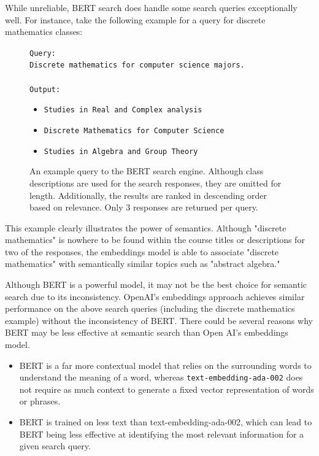\documentclass[
	a4paper, %
	10pt, %
	unnumberedsections, %
	twoside, %
]{LTJournalArticle}
\begin{document}
While unreliable, BERT search does handle some search queries exceptionally well. For instance, take the following example for a query for discrete mathematics classes:

\begin{figure}[h]
	\begin{center}
		\texttt{Query:} \\
		\texttt{Discrete mathematics for computer science majors.} \\
		\texttt{}\\
		\texttt{Output:} 
		\begin{itemize}
			\item \texttt{Studies in Real and Complex analysis}
			\item \texttt{Discrete Mathematics for Computer Science}
			\item \texttt{Studies in Algebra and Group Theory}
		\end{itemize}		
	\end{center}
	\caption{An example query to the BERT search engine. Although class descriptions are used for the search responses, they are omitted for length. Additionally, the results are ranked in descending order based on relevance. Only 3 responses are returned per query.}
\end{figure}

This example clearly illustrates the power of semantics. Although "discrete mathematics" is nowhere to be found within the course titles or descriptions for two of the responses, the embeddings model is able to associate "discrete mathematics" with semantically similar topics such as "abstract algebra." 

Although BERT is a powerful model, it may not be the best choice for semantic search due to its inconsistency. OpenAI's embeddings approach achieves similar performance on the above search queries (including the discrete mathematics example) without the inconsistency of BERT. There could be several reasons why BERT may be less effective at semantic search than Open AI's embeddings model. 

\begin{itemize}
	\item  BERT is a far more contextual model that relies on the surrounding words to understand the meaning of a word, whereas \texttt{text-embedding-ada-002} does not require as much context to generate a fixed vector representation of words or phrases. 
	\item BERT is trained on less text than text-embedding-ada-002, which can lead to BERT being less effective at identifying the most relevant information for a given search query.
\end{itemize}
\end{document}
